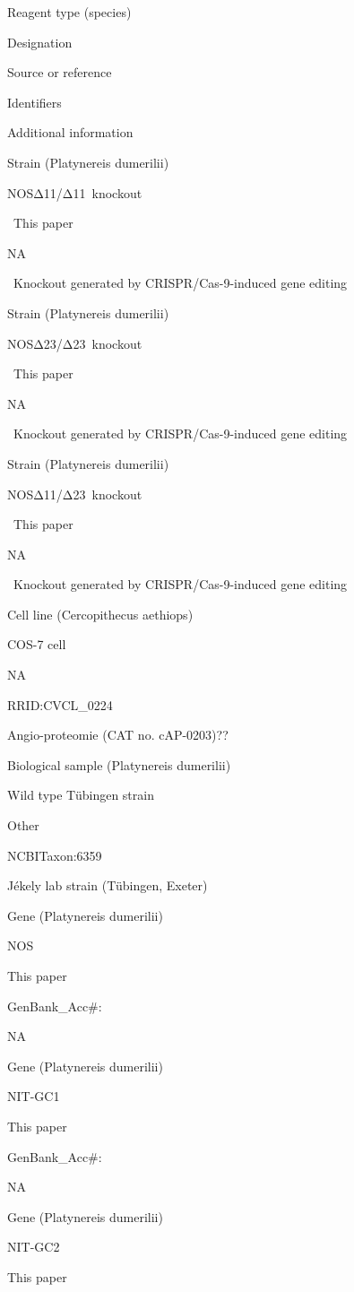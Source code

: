 \documentclass[
  10pt,
  onecolumn]{article}
\begin{document}
Reagent type (species)

Designation

Source or reference

Identifiers

Additional information

Strain (Platynereis dumerilii)

NOSΔ11/Δ11~knockout

~This paper

NA

~Knockout generated by CRISPR/Cas-9-induced gene editing

Strain (Platynereis dumerilii)

NOSΔ23/Δ23~knockout

~This paper

NA

~Knockout generated by CRISPR/Cas-9-induced gene editing

Strain (Platynereis dumerilii)

NOSΔ11/Δ23~knockout

~This paper

NA

~Knockout generated by CRISPR/Cas-9-induced gene editing

Cell line (Cercopithecus aethiops)

COS-7 cell

NA

RRID:CVCL\_0224

Angio-proteomie (CAT no. cAP-0203)??

Biological sample (Platynereis dumerilii)

Wild type Tübingen strain

Other

NCBITaxon:6359

Jékely lab strain (Tübingen, Exeter)

Gene (Platynereis dumerilii)

NOS

This paper

GenBank\_Acc\#:

NA

Gene (Platynereis dumerilii)

NIT-GC1

This paper

GenBank\_Acc\#:

NA

Gene (Platynereis dumerilii)

NIT-GC2

This paper
\end{document}
